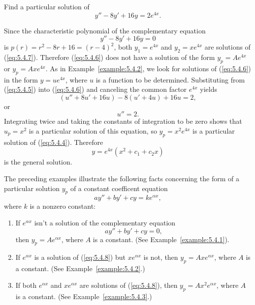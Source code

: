 \documentclass{ximera}
\begin{document}
\begin{example}\label{example:5.4.3}
Find a particular solution of
\begin{equation} \label{eq:5.4.6}
y''-8y'+16y=2e^{4x}.
\end{equation}
 
\begin{explanation}
Since the characteristic polynomial of the complementary equation
\begin{equation} \label{eq:5.4.7}
y''-8y'+16y=0
\end{equation}
is $p(r)=r^2-8r+16=(r-4)^2$, both $y_1=e^{4x}$ and $y_2=xe^{4x}$ are
solutions of (\ref{eq:5.4.7}). Therefore (\ref{eq:5.4.6}) does not have a
solution of the form $y_p=Ae^{4x}$ or $y_p=Axe^{4x}$. As in
Example~\ref{example:5.4.2}, we look for solutions of (\ref{eq:5.4.6}) in the
form $y=ue^{4x}$, where $u$ is a function to be determined.
Substituting from (\ref{eq:5.4.5}) into (\ref{eq:5.4.6}) and canceling the
common factor $e^{4x}$ yields
$$
(u''+8u'+16u)-8(u'+4u)+16u=2,
$$
or
$$
u''=2.
$$
Integrating twice and taking the constants of integration to be zero
shows that $u_p=x^2$ is a particular solution of this equation, so
$y_p=x^2e^{4x}$ is a particular solution of (\ref{eq:5.4.4}). Therefore
$$
y=e^{4x}(x^2+c_1+c_2x)
$$
is the general solution.
\end{explanation}
\end{example}
 
The preceding examples illustrate the following facts concerning
the form of a particular solution $y_p$
of a constant coefficent equation
$$
ay''+by'+cy=ke^{\alpha x},
$$
where $k$ is a nonzero constant:
 
\begin{enumerate}
\item\label{item:ypa} %
If $e^{\alpha x}$ isn't  a solution of the complementary
equation
\begin{equation} \label{eq:5.4.8}
ay''+by'+cy=0,
\end{equation}
then  $y_p=Ae^{\alpha x}$, where $A$ is a constant. (See
Example~\ref{example:5.4.1}).
\item \label{item:ypb} %
If $e^{\alpha x}$ is a solution of (\ref{eq:5.4.8}) but $xe^{\alpha x}$
is not, then  $y_p=Axe^{\alpha x}$,  where $A$ is a constant.
(See Example~\ref{example:5.4.2}.)
\item \label{item:ypc}%
If both $e^{\alpha x}$ and $xe^{\alpha x}$ are solutions of (\ref{eq:5.4.8}),
then  $y_p=Ax^2e^{\alpha x}$,  where $A$ is a constant.
(See Example~\ref{example:5.4.3}.)
\end{enumerate}
 
\end{document}
